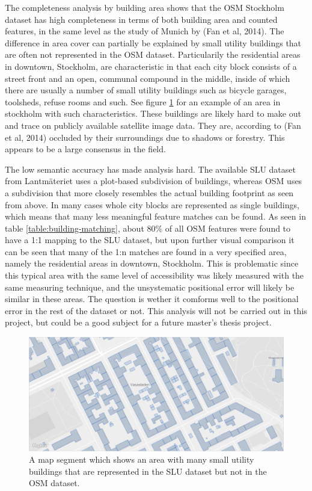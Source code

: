 \documentclass[a4paper]{article}
\begin{document}
The completeness analysis by building area shows that the OSM Stockholm dataset has high completeness in terms of both building area and counted features, in the same level as the study of Munich by (Fan et al, 2014).
The difference in area cover can partially be explained by small utility buildings that are often not represented in the OSM dataset.
Particularily the residential areas in downtown, Stockholm, are characteristic in that each city block consists of a street front and an open, communal compound in the middle, inside of which there are usually a number of small utility buildings such as bicycle garages, toolsheds, refuse rooms and such.
See figure \ref{fig:osm-slu-map-utility-buildings} for an example of an area in stockholm with such characteristics.
These buildings are likely hard to make out and trace on publicly available satellite image data.
They are, according to (Fan et al, 2014) occluded by their surroundings due to shadows or forestry.
This appears to be a large consensus in the field.

The low semantic accuracy has made analysis hard.
The available SLU dataset from Lantmäteriet uses a plot-based subdivision of buildings, whereas OSM uses a subdivision that more closely resembles the actual building footprint as seen from above.
In many cases whole city blocks are represented as single buildings, which means that many less meaningful feature matches can be found.
As seen in table \ref{table:building-matching}, about 80\% of all OSM features were found to have a 1:1 mapping to the SLU dataset, but upon further visual comparison it can be seen that many of the 1:n matches are found in a very specified area, namely the residential areas in downtown, Stockholm.
This is problematic since this typical area with the same level of accessibility was likely measured with the same measuring technique, and the unsystematic positional error will likely be similar in these areas.
The question is wether it comforms well to the positional error in the rest of the dataset or not.
This analysis will not be carried out in this project, but could be a good subject for a future master's thesis project.

\begin{figure}[H]
    \centering
    \includegraphics[width=\textwidth,height=0.5\textheight,keepaspectratio]{img_map_utility_buildings}
    \caption{A map segment which shows an area with many small utility buildings that are represented in the SLU dataset but not in the OSM dataset.}
    \label{fig:osm-slu-map-utility-buildings}
\end{figure}
\end{document}
